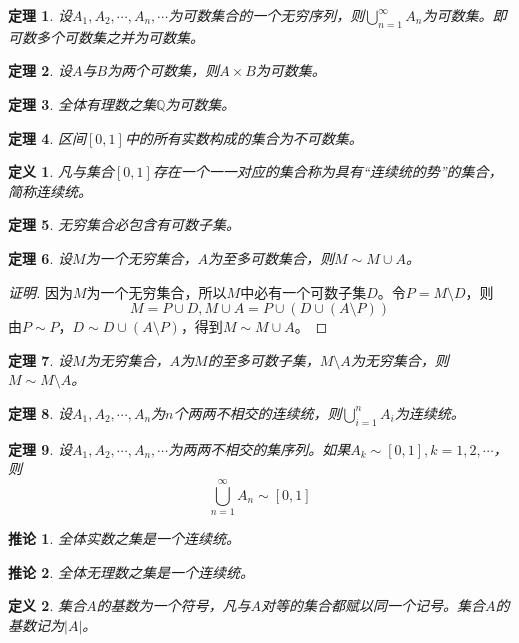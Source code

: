 \documentclass{book}[oneside]
\newtheorem{Def}{定义}[chapter]
\newtheorem{Thm}{定理}[chapter]
\newtheorem{Cor}{推论}[chapter]
\begin{document}
\begin{CJK*}{UTF8}{gbsn}
    \begin{Thm}
    设$A_1, A_2, \cdots, A_n, \cdots$为可数集合的一个无穷序列，则$\bigcup_{n=1}^{\infty}A_n$为可数集。即可数多个可数集之并为可数集。
  \end{Thm}
  \begin{Thm}
    设$A$与$B$为两个可数集，则$A\times B$为可数集。
  \end{Thm}
  \begin{Thm}
    全体有理数之集$\mathbb{Q}$为可数集。
  \end{Thm}
  \begin{Thm}
    区间$[0,1]$中的所有实数构成的集合为不可数集。
  \end{Thm}
  \begin{Def}
    凡与集合$[0,1]$存在一个一一对应的集合称为具有“连续统的势”的集合，简称连续统。
  \end{Def}
    \begin{Thm}
    无穷集合必包含有可数子集。
  \end{Thm}
  \begin{Thm}
    设$M$为一个无穷集合，$A$为至多可数集合，则$M \sim M \cup A$。
  \end{Thm}
  \begin{proof}[证明]
    因为$M$为一个无穷集合，所以$M$中必有一个可数子集$D$。令$P=M\setminus D$，则
    \[M=P\cup D, M\cup A = P\cup (D\cup (A\setminus P))\]
    由$P\sim P$，$D\sim D\cup (A\setminus P)$，得到$M\sim M\cup A$。
  \end{proof}
  \begin{Thm}
    设$M$为无穷集合，$A$为$M$的至多可数子集，$M\setminus A$为无穷集合，则$M \sim M\setminus A$。
  \end{Thm}
  \begin{Thm}
    设$A_1, A_2, \cdots, A_n$为$n$个两两不相交的连续统，则$\bigcup_{i=1}^nA_i$为连续统。
  \end{Thm}
  \begin{Thm}
    设$A_1, A_2, \cdots, A_n, \cdots$为两两不相交的集序列。如果$A_k \sim [0,1], k = 1, 2, \cdots$，则
    \[\bigcup_{n=1}^{\infty}A_n \sim [0,1]\]
  \end{Thm}
 \begin{Cor}
   全体实数之集是一个连续统。
 \end{Cor}
 \begin{Cor}
   全体无理数之集是一个连续统。
 \end{Cor}
  \begin{Def}
    集合$A$的基数为一个符号，凡与$A$对等的集合都赋以同一个记号。集合$A$的基数记为$|A|$。
  \end{Def}

\end{CJK*}
\end{document}
